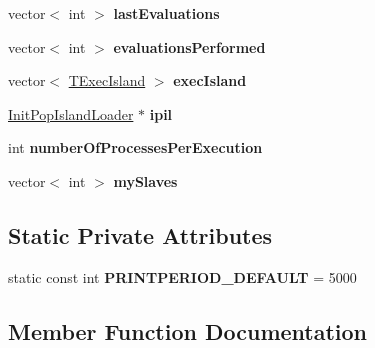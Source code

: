 \begin{DoxyCompactItemize}
\item 
\mbox{\label{classCoordinatorIsland_a4c4c0802869ba5e9c882a0463109d435}} 
vector$<$ int $>$ {\bfseries last\+Evaluations}
\item 
\mbox{\label{classCoordinatorIsland_a592ffc45c62534e9dce75f600293a62c}} 
vector$<$ int $>$ {\bfseries evaluations\+Performed}
\item 
\mbox{\label{classCoordinatorIsland_ad0905830cccafc8991eddc85888560e4}} 
vector$<$ \mbox{\hyperlink{structTExecIsland}{T\+Exec\+Island}} $>$ {\bfseries exec\+Island}
\item 
\mbox{\label{classCoordinatorIsland_ae7722d9300999fd9c97f58feb67f6a17}} 
\mbox{\hyperlink{classInitPopIslandLoader}{Init\+Pop\+Island\+Loader}} $\ast$ {\bfseries ipil}
\item 
\mbox{\label{classCoordinatorIsland_a12f619d43a6a4c160d0f3a6c38122cbe}} 
int {\bfseries number\+Of\+Processes\+Per\+Execution}
\item 
\mbox{\label{classCoordinatorIsland_ac3e7e32442c3ebbc99d6196a0bf0529c}} 
vector$<$ int $>$ {\bfseries my\+Slaves}
\end{DoxyCompactItemize}
\subsection*{Static Private Attributes}
\begin{DoxyCompactItemize}
\item 
\mbox{\label{classCoordinatorIsland_a235933ff7bfb25907f929664f42d79ef}} 
static const int {\bfseries P\+R\+I\+N\+T\+P\+E\+R\+I\+O\+D\+\_\+\+D\+E\+F\+A\+U\+LT} = 5000
\end{DoxyCompactItemize}


\subsection{Member Function Documentation}
\mbox{\label{classCoordinatorIsland_a25c1872d7c83a2e2855d2db4ada2f06d}} 
